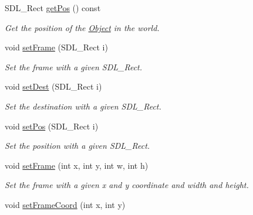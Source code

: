 \begin{DoxyCompactItemize}
S\+D\+L\+\_\+\+Rect \hyperlink{classObject_abd35d67f6a3a23284887feed5ad26c9a}{get\+Pos} () const
\begin{DoxyCompactList}\small\item\em Get the position of the \hyperlink{classObject}{Object} in the world. \end{DoxyCompactList}\item 
\mbox{\label{classObject_a720ff968db3849ae49437fc8d01246ef}} 
void \hyperlink{classObject_a720ff968db3849ae49437fc8d01246ef}{set\+Frame} (S\+D\+L\+\_\+\+Rect i)
\begin{DoxyCompactList}\small\item\em Set the frame with a given S\+D\+L\+\_\+\+Rect. \end{DoxyCompactList}\item 
\mbox{\label{classObject_ae2dc77ca41ab1a49aa15c97539d28f5c}} 
void \hyperlink{classObject_ae2dc77ca41ab1a49aa15c97539d28f5c}{set\+Dest} (S\+D\+L\+\_\+\+Rect i)
\begin{DoxyCompactList}\small\item\em Set the destination with a given S\+D\+L\+\_\+\+Rect. \end{DoxyCompactList}\item 
\mbox{\label{classObject_adc0bcac930604c018ddf3c0129f50317}} 
void \hyperlink{classObject_adc0bcac930604c018ddf3c0129f50317}{set\+Pos} (S\+D\+L\+\_\+\+Rect i)
\begin{DoxyCompactList}\small\item\em Set the position with a given S\+D\+L\+\_\+\+Rect. \end{DoxyCompactList}\item 
\mbox{\label{classObject_a52bedccbb5a658daf8c8ef2abbd5d76e}} 
void \hyperlink{classObject_a52bedccbb5a658daf8c8ef2abbd5d76e}{set\+Frame} (int x, int y, int w, int h)
\begin{DoxyCompactList}\small\item\em Set the frame with a given x and y coordinate and width and height. \end{DoxyCompactList}\item 
\mbox{\label{classObject_ab2213d14a8983028d49192d49770e0bc}} 
void \hyperlink{classObject_ab2213d14a8983028d49192d49770e0bc}{set\+Frame\+Coord} (int x, int y)

\end{DoxyCompactItemize}
